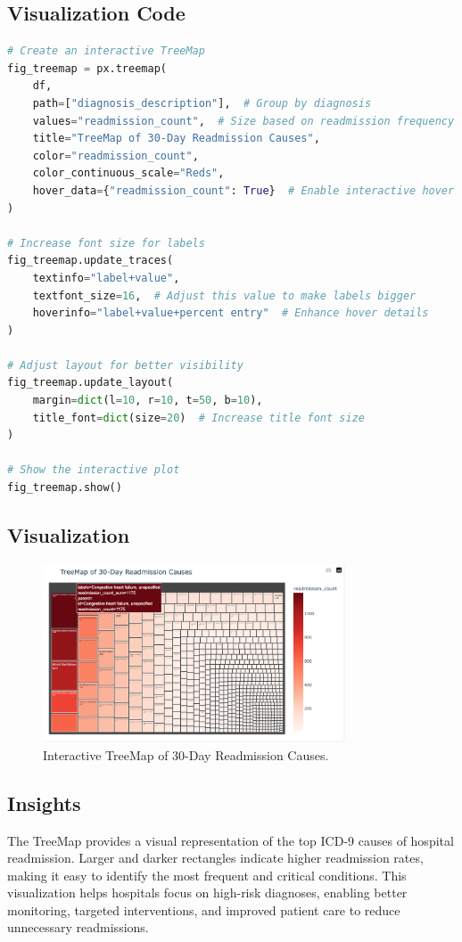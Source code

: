 \documentclass[a4paper,10pt]{article}
\begin{document}
\subsection{Visualization Code}
\begin{lstlisting}[language=Python]
# Create an interactive TreeMap
fig_treemap = px.treemap(
    df,
    path=["diagnosis_description"],  # Group by diagnosis
    values="readmission_count",  # Size based on readmission frequency
    title="TreeMap of 30-Day Readmission Causes",
    color="readmission_count",
    color_continuous_scale="Reds",
    hover_data={"readmission_count": True}  # Enable interactive hover information
)

# Increase font size for labels
fig_treemap.update_traces(
    textinfo="label+value",
    textfont_size=16,  # Adjust this value to make labels bigger
    hoverinfo="label+value+percent entry"  # Enhance hover details
)

# Adjust layout for better visibility
fig_treemap.update_layout(
    margin=dict(l=10, r=10, t=50, b=10),
    title_font=dict(size=20)  # Increase title font size
)

# Show the interactive plot
fig_treemap.show()
\end{lstlisting}

\subsection{Visualization}
\begin{figure}[h]
    \centering
    \includegraphics[width=0.8\textwidth]{figure3.png}
    \caption{Interactive TreeMap of 30-Day Readmission Causes.}
    \label{fig:readmission_treemap}
\end{figure}

\subsection{Insights}
The TreeMap provides a visual representation of the top ICD-9 causes of hospital readmission. Larger and darker rectangles indicate higher readmission rates, making it easy to identify the most frequent and critical conditions. This visualization helps hospitals focus on high-risk diagnoses, enabling better monitoring, targeted interventions, and improved patient care to reduce unnecessary readmissions.
\end{document}
